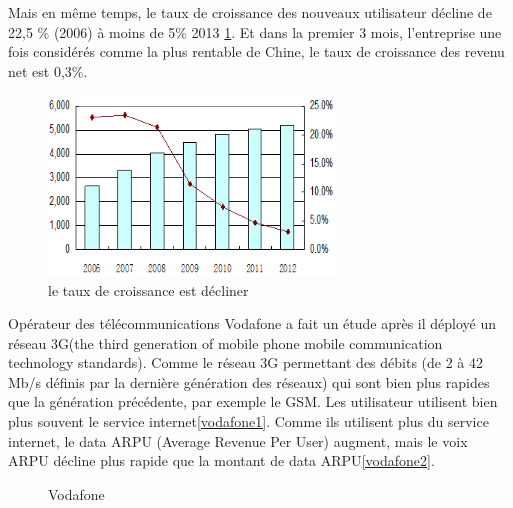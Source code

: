 Mais en même temps, le taux de croissance des nouveaux utilisateur décline de 22,5 \% (2006) à moins de 5\% 2013 \ref{tauxdecroissance}. Et dans la premier 3 mois, l'entreprise une fois considérés comme la plus rentable de Chine, le taux de croissance des revenu net est 0,3\%.

      \begin{figure}[H]
          \centering
          \includegraphics[width=3in]{images/1.png}
          \caption{le taux de croissance est décliner}
          \label{tauxdecroissance}
      \end{figure}
Opérateur des télécommunications Vodafone a fait un étude après il déployé un réseau 3G(\textsf{the third generation of mobile phone mobile communication technology standards}). Comme le réseau 3G permettant des débits (de 2 à 42 Mb/s définis par la dernière génération des réseaux) qui sont bien plus rapides que la génération précédente, par exemple le GSM. Les utilisateur utilisent bien plus souvent le service internet\ref{vodafone1}. Comme ils utilisent plus du service internet, le data ARPU (Average Revenue Per User) augment, mais le voix ARPU décline plus rapide que la montant de data ARPU\ref{vodafone2}. 
 \begin{figure}[H]
 	\flushleft
 	 	\hfill
 	\hspace{1in}	 
 	\caption{Vodafone} 
 \end{figure}
 
